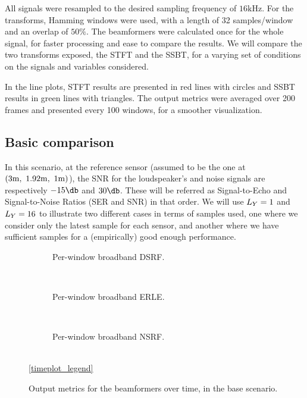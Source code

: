 All signals were resampled to the desired sampling frequency of $16\si{\kilo\hertz}$. For the transforms, Hamming windows were used, with a length of 32 samples/window and an overlap of $50\%$. The beamformers were calculated once for the whole signal, for faster processing and ease to compare the results. We will compare the two transforms exposed, the STFT and the SSBT, for a varying set of conditions on the signals and variables considered.

In the line plots, STFT results are presented in red lines with circles and SSBT results in green lines with triangles. The output metrics were averaged over 200 frames and presented every 100 windows, for a smoother visualization.
%

\subsection{Basic comparison}
In this scenario, at the reference sensor (assumed to be the one at $(3\si{\meter},~1.92\si{\meter},~1\si{\meter})$), the SNR for the loudspeaker's and noise signals are respectively $-15\dB$ and $30\dB$. These will be referred as Signal-to-Echo and Signal-to-Noise Ratios (SER and SNR) in that order. We will use $\Ly = 1$ and $\Ly = 16$ to illustrate two different cases in terms of samples used, one where we consider only the latest sample for each sensor, and another where we have sufficient samples for a (empirically) good enough performance.


\begin{figure}[!ht]
	\centering
	\begin{subfigure}{\textwidth}
		\centering
		
		\caption{Per-window broadband DSRF.}
		\label{subfig:lineplot__DSRF_l__iSER_n15__err_0}
	\end{subfigure}\\[1em]
	\begin{subfigure}{\textwidth}
		\centering
		
		\caption{Per-window broadband ERLE.}
		\label{subfig:lineplot__gSER_l__iSER_n15__err_0}
	\end{subfigure}\\[1em]
	\begin{subfigure}{\textwidth}
		\centering
		
		\caption{Per-window broadband NSRF.}
		\label{subfig:lineplot__gSNR_l__iSER_n15__err_0}
	\end{subfigure}\\[1em]
	\ref*{timeplot_legend}
	\caption{Output metrics for the beamformers over time, in the base scenario.}
	\label{fig:lineplot__iSER_n15__Ly_1__err_0}
\end{figure}

